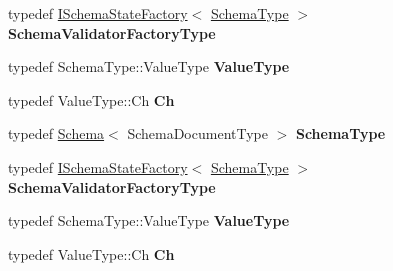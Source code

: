 \begin{DoxyCompactItemize}
\item 
typedef \hyperlink{classinternal_1_1_i_schema_state_factory}{I\+Schema\+State\+Factory}$<$ \hyperlink{classinternal_1_1_schema}{Schema\+Type} $>$ {\bfseries Schema\+Validator\+Factory\+Type}\hypertarget{structinternal_1_1_schema_validation_context_a33fa91fd8e880d1adb9b891fe441f110}{}\label{structinternal_1_1_schema_validation_context_a33fa91fd8e880d1adb9b891fe441f110}

\item 
typedef Schema\+Type\+::\+Value\+Type {\bfseries Value\+Type}\hypertarget{structinternal_1_1_schema_validation_context_acc134e808d3a4dbe8834eb1a3e98e816}{}\label{structinternal_1_1_schema_validation_context_acc134e808d3a4dbe8834eb1a3e98e816}

\item 
typedef Value\+Type\+::\+Ch {\bfseries Ch}\hypertarget{structinternal_1_1_schema_validation_context_abd905cd1513b117f1db68b58d6c41daf}{}\label{structinternal_1_1_schema_validation_context_abd905cd1513b117f1db68b58d6c41daf}

\item 
typedef \hyperlink{classinternal_1_1_schema}{Schema}$<$ Schema\+Document\+Type $>$ {\bfseries Schema\+Type}\hypertarget{structinternal_1_1_schema_validation_context_a79b155ab3711b97b6e33ced450614397}{}\label{structinternal_1_1_schema_validation_context_a79b155ab3711b97b6e33ced450614397}

\item 
typedef \hyperlink{classinternal_1_1_i_schema_state_factory}{I\+Schema\+State\+Factory}$<$ \hyperlink{classinternal_1_1_schema}{Schema\+Type} $>$ {\bfseries Schema\+Validator\+Factory\+Type}\hypertarget{structinternal_1_1_schema_validation_context_a33fa91fd8e880d1adb9b891fe441f110}{}\label{structinternal_1_1_schema_validation_context_a33fa91fd8e880d1adb9b891fe441f110}

\item 
typedef Schema\+Type\+::\+Value\+Type {\bfseries Value\+Type}\hypertarget{structinternal_1_1_schema_validation_context_acc134e808d3a4dbe8834eb1a3e98e816}{}\label{structinternal_1_1_schema_validation_context_acc134e808d3a4dbe8834eb1a3e98e816}

\item 
typedef Value\+Type\+::\+Ch {\bfseries Ch}\hypertarget{structinternal_1_1_schema_validation_context_abd905cd1513b117f1db68b58d6c41daf}{}\label{structinternal_1_1_schema_validation_context_abd905cd1513b117f1db68b58d6c41daf}

\end{DoxyCompactItemize}

